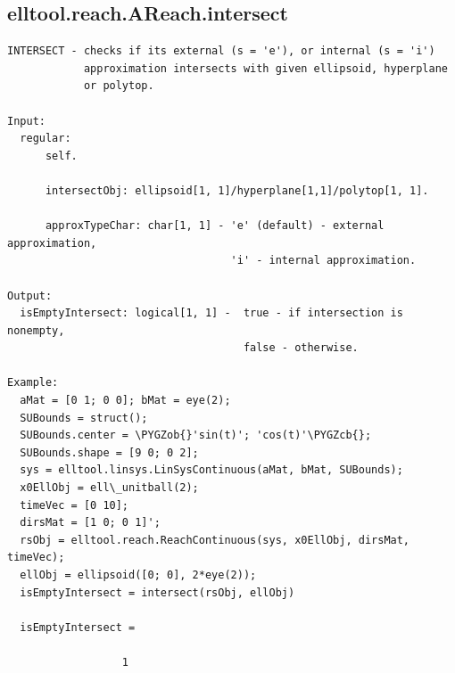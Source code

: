 \documentclass[letterpaper,10pt,english]{sphinxmanual}
\def\PYGZob{\char`\{}
\def\PYGZcb{\char`\}}
\begin{document}
\subsection{elltool.reach.AReach.intersect}
\label{chap_functions:elltool-reach-areach-intersect}
\begin{Verbatim}[commandchars=\\\{\}]
INTERSECT - checks if its external (s = 'e'), or internal (s = 'i')
            approximation intersects with given ellipsoid, hyperplane
            or polytop.

Input:
  regular:
      self.

      intersectObj: ellipsoid[1, 1]/hyperplane[1,1]/polytop[1, 1].

      approxTypeChar: char[1, 1] - 'e' (default) - external approximation,
                                   'i' - internal approximation.

Output:
  isEmptyIntersect: logical[1, 1] -  true - if intersection is nonempty,
                                     false - otherwise.

Example:
  aMat = [0 1; 0 0]; bMat = eye(2);
  SUBounds = struct();
  SUBounds.center = \PYGZob{}'sin(t)'; 'cos(t)'\PYGZcb{};
  SUBounds.shape = [9 0; 0 2];
  sys = elltool.linsys.LinSysContinuous(aMat, bMat, SUBounds);
  x0EllObj = ell\_unitball(2);
  timeVec = [0 10];
  dirsMat = [1 0; 0 1]';
  rsObj = elltool.reach.ReachContinuous(sys, x0EllObj, dirsMat, timeVec);
  ellObj = ellipsoid([0; 0], 2*eye(2));
  isEmptyIntersect = intersect(rsObj, ellObj)

  isEmptyIntersect =

                  1
\end{Verbatim}
\end{document}
